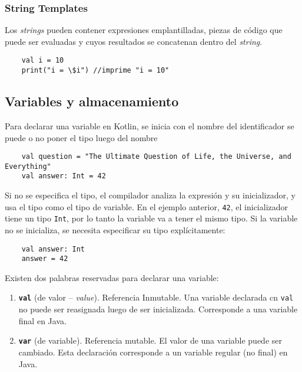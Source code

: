 \subsubsection{String Templates}
Los \emph{strings} pueden contener expresiones emplantilladas, piezas de código que puede ser evaluadas y cuyos resultados se concatenan dentro del \emph{string}. 
\begin{verbatim}
    val i = 10
    print("i = \$i") //imprime "i = 10"
\end{verbatim}




\subsection{Variables y almacenamiento} \label{sec:variables-almacenamiento}
Para declarar una variable en Kotlin, se inicia con el nombre del identificador se puede o no poner el tipo luego del nombre
\begin{verbatim}
    val question = "The Ultimate Question of Life, the Universe, and Everything"
    val answer: Int = 42
\end{verbatim}
Si no se especifica el tipo, el compilador analiza la expresión y su inicializador, y usa el tipo como el tipo de variable\cite{kotlin-in-action}. En el ejemplo anterior, \texttt{42}, el inicializador tiene un tipo \texttt{Int}, por lo tanto la variable va a tener el mismo tipo. Si la variable no se inicializa, se necesita especificar su tipo explícitamente:
\begin{verbatim}
    val answer: Int
    answer = 42
\end{verbatim}

Existen dos palabras reservadas para declarar una variable:
\begin{enumerate}
    \item \textbf{\texttt{val}} (de valor -- \emph{value}). Referencia Inmutable. Una variable declarada cn \texttt{val} no puede ser reasignada luego de ser inicializada. Corresponde a una variable final en Java.
    \item \textbf{\texttt{var}} (de variable). Referencia mutable. El valor de una variable puede ser cambiado. Esta declaración corresponde a un variable regular (no final) en Java.
\end{enumerate}

